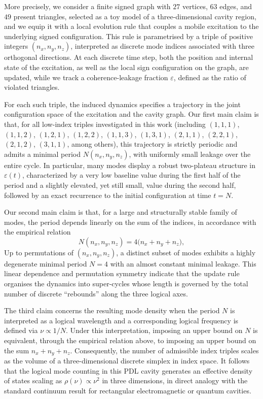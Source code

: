 \documentclass{article}
\theoremstyle{definition}
\begin{document}
More precisely, we consider a finite signed graph with $27$ vertices, $63$ edges, and $49$ present triangles, selected as a toy model of a three-dimensional cavity region, and we equip it with a local evolution rule that couples a mobile excitation to the underlying signed configuration.\cite{Effective_Fields_PDL_2026} This rule is parametrised by a triple of positive integers $(n_x,n_y,n_z)$, interpreted as discrete mode indices associated with three orthogonal directions. At each discrete time step, both the position and internal state of the excitation, as well as the local sign configuration on the graph, are updated, while we track a coherence-leakage fraction $\varepsilon$, defined as the ratio of violated triangles.\cite{Exponent_18_PDL_2026,Topological_Reformulation_PDL_2026}

For each such triple, the induced dynamics specifies a trajectory in the joint configuration space of the excitation and the cavity graph. Our first main claim is that, for all low-index triples investigated in this work (including $(1,1,1)$, $(1,1,2)$, $(1,2,1)$, $(1,2,2)$, $(1,1,3)$, $(1,3,1)$, $(2,1,1)$, $(2,2,1)$, $(2,1,2)$, $(3,1,1)$, among others), this trajectory is strictly periodic and admits a minimal period $N(n_x,n_y,n_z)$, with uniformly small leakage over the entire cycle.\cite{Effective_Fields_PDL_2026,Exponent_18_PDL_2026} In particular, many modes display a robust two-plateau structure in $\varepsilon(t)$, characterized by a very low baseline value during the first half of the period and a slightly elevated, yet still small, value during the second half, followed by an exact recurrence to the initial configuration at time $t = N$.

Our second main claim is that, for a large and structurally stable family of modes, the period depends linearly on the sum of the indices, in accordance with the empirical relation
\[
N(n_x,n_y,n_z) = 4 \bigl(n_x + n_y + n_z\bigr),
\]
Up to permutations of $(n_x,n_y,n_z)$, a distinct subset of modes exhibits a highly degenerate minimal period $N = 4$ with an almost constant minimal leakage.\cite{Effective_Fields_PDL_2026} This linear dependence and permutation symmetry indicate that the update rule organises the dynamics into super-cycles whose length is governed by the total number of discrete “rebounds” along the three logical axes.

The third claim concerns the resulting mode density when the period $N$ is interpreted as a logical wavelength and a corresponding logical frequency is defined via $\nu \propto 1/N$.\cite{Density_of_states_Notes,EM_Cavities_Notes} Under this interpretation, imposing an upper bound on $N$ is equivalent, through the empirical relation above, to imposing an upper bound on the sum $n_x + n_y + n_z$. Consequently, the number of admissible index triples scales as the volume of a three-dimensional discrete simplex in index space.\cite{Density_of_states_Notes,Counting_States_2021} It follows that the logical mode counting in this PDL cavity generates an effective density of states scaling as $\rho(\nu) \propto \nu^2$ in three dimensions, in direct analogy with the standard continuum result for rectangular electromagnetic or quantum cavities.\cite{Density_of_states_Notes,EM_Cavities_Notes,Counting_States_2021}
\end{document}
